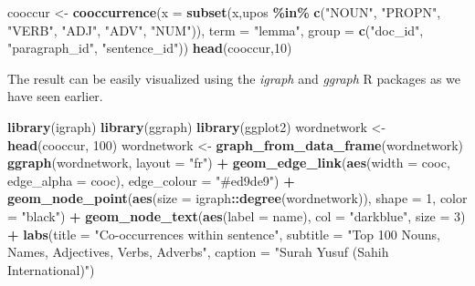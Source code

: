 \documentclass[
]{article}
\newenvironment{Shaded}{\begin{snugshade}}{\end{snugshade}}
\newcommand{\AttributeTok}[1]{\textcolor[rgb]{0.13,0.29,0.53}{#1}}
\newcommand{\DecValTok}[1]{\textcolor[rgb]{0.00,0.00,0.81}{#1}}
\newcommand{\FunctionTok}[1]{\textcolor[rgb]{0.13,0.29,0.53}{\textbf{#1}}}
\newcommand{\NormalTok}[1]{#1}
\newcommand{\OtherTok}[1]{\textcolor[rgb]{0.56,0.35,0.01}{#1}}
\newcommand{\SpecialCharTok}[1]{\textcolor[rgb]{0.81,0.36,0.00}{\textbf{#1}}}
\newcommand{\StringTok}[1]{\textcolor[rgb]{0.31,0.60,0.02}{#1}}
\begin{document}
\footnotesize

\begin{Shaded}
\begin{Highlighting}[]
\NormalTok{cooccur }\OtherTok{\textless{}{-}} \FunctionTok{cooccurrence}\NormalTok{(}\AttributeTok{x =} \FunctionTok{subset}\NormalTok{(x,upos }\SpecialCharTok{\%in\%} \FunctionTok{c}\NormalTok{(}\StringTok{"NOUN"}\NormalTok{, }\StringTok{"PROPN"}\NormalTok{, }\StringTok{"VERB"}\NormalTok{,}
                                                \StringTok{"ADJ"}\NormalTok{, }\StringTok{"ADV"}\NormalTok{, }\StringTok{"NUM"}\NormalTok{)), }
                        \AttributeTok{term =} \StringTok{"lemma"}\NormalTok{, }
                        \AttributeTok{group =} \FunctionTok{c}\NormalTok{(}\StringTok{"doc\_id"}\NormalTok{, }\StringTok{"paragraph\_id"}\NormalTok{, }\StringTok{"sentence\_id"}\NormalTok{))}
\FunctionTok{head}\NormalTok{(cooccur,}\DecValTok{10}\NormalTok{)}
\end{Highlighting}
\end{Shaded}

\normalsize

The result can be easily visualized using the \emph{igraph} and \emph{ggraph} R packages as we have seen earlier.

\begin{Shaded}
\begin{Highlighting}[]
\FunctionTok{library}\NormalTok{(igraph)}
\FunctionTok{library}\NormalTok{(ggraph)}
\FunctionTok{library}\NormalTok{(ggplot2)}
\NormalTok{wordnetwork }\OtherTok{\textless{}{-}} \FunctionTok{head}\NormalTok{(cooccur, }\DecValTok{100}\NormalTok{)}
\NormalTok{wordnetwork }\OtherTok{\textless{}{-}} \FunctionTok{graph\_from\_data\_frame}\NormalTok{(wordnetwork)}
\FunctionTok{ggraph}\NormalTok{(wordnetwork, }\AttributeTok{layout =} \StringTok{"fr"}\NormalTok{) }\SpecialCharTok{+}
  \FunctionTok{geom\_edge\_link}\NormalTok{(}\FunctionTok{aes}\NormalTok{(}\AttributeTok{width =}\NormalTok{ cooc, }\AttributeTok{edge\_alpha =}\NormalTok{ cooc), }\AttributeTok{edge\_colour =} \StringTok{"\#ed9de9"}\NormalTok{) }\SpecialCharTok{+}
  \FunctionTok{geom\_node\_point}\NormalTok{(}\FunctionTok{aes}\NormalTok{(}\AttributeTok{size =}\NormalTok{ igraph}\SpecialCharTok{::}\FunctionTok{degree}\NormalTok{(wordnetwork)), }\AttributeTok{shape =} \DecValTok{1}\NormalTok{, }
                  \AttributeTok{color =} \StringTok{"black"}\NormalTok{) }\SpecialCharTok{+}
  \FunctionTok{geom\_node\_text}\NormalTok{(}\FunctionTok{aes}\NormalTok{(}\AttributeTok{label =}\NormalTok{ name), }\AttributeTok{col =} \StringTok{"darkblue"}\NormalTok{, }\AttributeTok{size =} \DecValTok{3}\NormalTok{) }\SpecialCharTok{+}
  \FunctionTok{labs}\NormalTok{(}\AttributeTok{title =} \StringTok{"Co{-}occurrences within sentence"}\NormalTok{,}
       \AttributeTok{subtitle =} \StringTok{"Top 100 Nouns, Names, Adjectives, Verbs, Adverbs"}\NormalTok{,}
       \AttributeTok{caption =} \StringTok{"Surah Yusuf (Sahih International)"}\NormalTok{)}
\end{Highlighting}
\end{Shaded}
\end{document}
